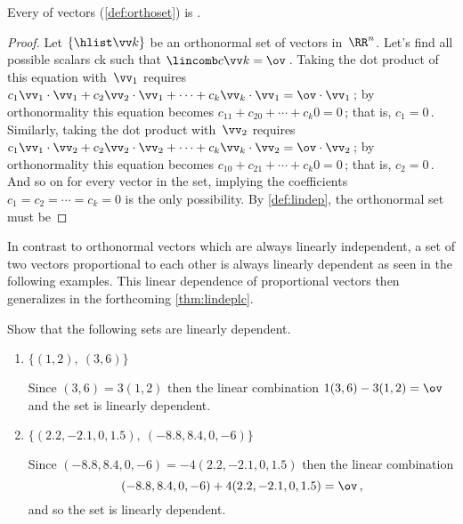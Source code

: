 \begin{theorem} \label{thm:ortholi}
Every  of vectors (\cref{def:orthoset}) is .
\end{theorem}
\begin{proof} %
Let \(\{\hlist\vv k\}\) be an orthonormal set of vectors in~\(\RR^n\).
Let's find all possible scalars \hlist ck such that \(\lincomb c\vv k=\ov\)\,.
Taking the dot product of this equation with~\(\vv_1\) requires
\(c_1\vv_1\cdot\vv_1+c_2\vv_2\cdot\vv_1+\cdots+c_k\vv_k\cdot\vv_1=\ov\cdot\vv_1\)\,;
by orthonormality this equation becomes
\(c_11+c_20+\cdots+c_k0=0\)\,; that is, \(c_1=0\)\,.
Similarly, taking the dot product with~\(\vv_2\) requires
\(c_1\vv_1\cdot\vv_2+c_2\vv_2\cdot\vv_2+\cdots+c_k\vv_k\cdot\vv_2=\ov\cdot\vv_2\)\,;
by orthonormality this equation becomes
\(c_10+c_21+\cdots+c_k0=0\)\,; that is, \(c_2=0\)\,.
And so on for every vector in the set, implying the coefficients \(c_1=c_2=\cdots=c_k=0\) is the only possibility.
By \cref{def:lindep}, the orthonormal set must be 
\end{proof}


In contrast to orthonormal vectors which are always linearly independent, a set of two vectors proportional to each other is always linearly dependent as seen in the following examples.
This linear dependence of proportional vectors then generalizes in the forthcoming \cref{thm:lindeplc}.




\begin{example} 
Show that the following sets are linearly dependent.
\begin{enumerate}
\item \(\{(1,2),\ (3,6)\}\)
\begin{solution} 
Since \((3,6)=3(1,2)\) then the linear combination \(1(3,6)-3(1,2)=\ov\) and the set is linearly dependent. 
\end{solution}

\item \(\{(2.2,-2.1,0,1.5),\ (-8.8,8.4,0,-6)\}\)
\begin{solution} 
Since  \((-8.8,8.4,0,-6)=-4(2.2,-2.1,0,1.5)\) then the linear combination 
\begin{equation*}
(-8.8,8.4,0,-6)+4(2.2,-2.1,0,1.5)=\ov\,,
\end{equation*}
and so the set is linearly dependent.
\end{solution}
\end{enumerate}
\end{example}





